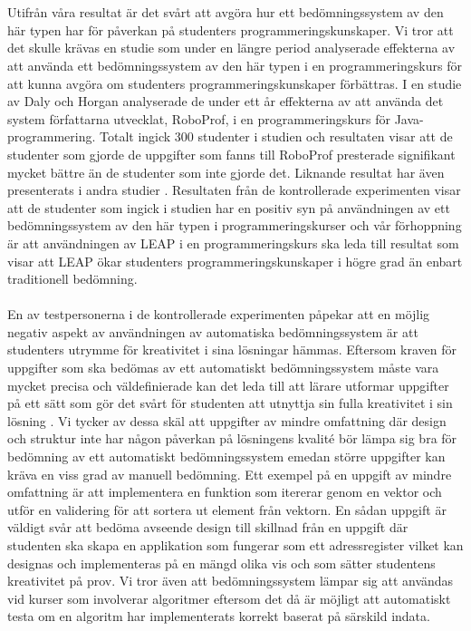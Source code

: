 \documentclass[a4paper,11pt]{article}
\begin{document}
{\\
\\
Utifrån våra resultat är det svårt att avgöra hur ett bedömningssystem av den här typen har för påverkan på studenters programmeringskunskaper. Vi tror att det skulle krävas en studie som under en längre period analyserade effekterna av att använda ett bedömningssystem av den här typen i en programmeringskurs för att kunna avgöra om studenters programmeringskunskaper förbättras. I en studie av Daly och Horgan \cite{roboprof_4} analyserade de under ett år effekterna av att använda det system författarna utvecklat, RoboProf, i en programmeringskurs för Java-programmering. Totalt ingick 300 studenter i studien och resultaten visar att de studenter som gjorde de uppgifter som fanns till RoboProf presterade signifikant mycket bättre än de studenter som inte gjorde det. Liknande resultat har även presenterats i andra studier \cite{higgins_coursemarker_12} \cite{japanerna_1}. Resultaten från de kontrollerade experimenten visar att de studenter som ingick i studien har en positiv syn på användningen av ett bedömningssystem av den här typen i programmeringskurser och vår förhoppning är att användningen av LEAP i en programmeringskurs ska leda till resultat som visar att LEAP ökar studenters programmeringskunskaper i högre grad än enbart traditionell bedömning. 
\\
\\
En av testpersonerna i de kontrollerade experimenten påpekar att en möjlig negativ aspekt av användningen av automatiska bedömningssystem är att studenters utrymme för kreativitet i sina lösningar hämmas. Eftersom kraven för uppgifter som ska bedömas av ett automatiskt bedömningssystem måste vara mycket precisa och väldefinierade kan det leda till att lärare utformar uppgifter på ett sätt som gör det svårt för studenten att utnyttja sin fulla kreativitet i sin lösning \cite{pieterse}.  Vi tycker av dessa skäl att uppgifter av mindre omfattning där design och struktur inte har någon påverkan på lösningens kvalité bör lämpa sig bra för bedömning av ett automatiskt bedömningssystem emedan större uppgifter kan kräva en viss grad av manuell bedömning. Ett exempel på en uppgift av mindre omfattning är att implementera en funktion som itererar genom en vektor och utför en validering för att sortera ut element från vektorn. En sådan uppgift är väldigt svår att bedöma avseende design till skillnad från en uppgift där studenten ska skapa en applikation som fungerar som ett adressregister vilket kan designas och implementeras på en mängd olika vis och som sätter studentens kreativitet på prov. Vi tror även att bedömningssystem lämpar sig att användas vid kurser som involverar algoritmer eftersom det då är möjligt att automatiskt testa om en algoritm har implementerats korrekt baserat på särskild indata.
}
\end{document}
